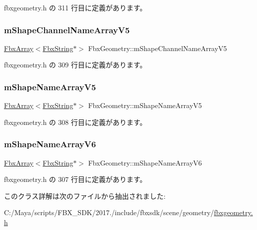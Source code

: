  fbxgeometry.\+h の 311 行目に定義があります。

\mbox{\label{class_fbx_geometry_a8752a5800b261d678592dc7a81dad4b0}} 
\subsubsection{\texorpdfstring{m\+Shape\+Channel\+Name\+Array\+V5}{mShapeChannelNameArrayV5}}
{\footnotesize\ttfamily \hyperlink{class_fbx_array}{Fbx\+Array}$<$\hyperlink{class_fbx_string}{Fbx\+String}$\ast$$>$ Fbx\+Geometry\+::m\+Shape\+Channel\+Name\+Array\+V5\hspace{0.3cm}{\ttfamily [protected]}}



 fbxgeometry.\+h の 309 行目に定義があります。

\mbox{\label{class_fbx_geometry_a2a38009f990f6dfa9ca81ee2b24b024b}} 
\subsubsection{\texorpdfstring{m\+Shape\+Name\+Array\+V5}{mShapeNameArrayV5}}
{\footnotesize\ttfamily \hyperlink{class_fbx_array}{Fbx\+Array}$<$\hyperlink{class_fbx_string}{Fbx\+String}$\ast$$>$ Fbx\+Geometry\+::m\+Shape\+Name\+Array\+V5\hspace{0.3cm}{\ttfamily [protected]}}



 fbxgeometry.\+h の 308 行目に定義があります。

\mbox{\label{class_fbx_geometry_a7f09646b7a716f58932d9be9c4a34486}} 
\subsubsection{\texorpdfstring{m\+Shape\+Name\+Array\+V6}{mShapeNameArrayV6}}
{\footnotesize\ttfamily \hyperlink{class_fbx_array}{Fbx\+Array}$<$\hyperlink{class_fbx_string}{Fbx\+String}$\ast$$>$ Fbx\+Geometry\+::m\+Shape\+Name\+Array\+V6\hspace{0.3cm}{\ttfamily [protected]}}



 fbxgeometry.\+h の 307 行目に定義があります。



このクラス詳解は次のファイルから抽出されました\+:\begin{DoxyCompactItemize}
\item 
C\+:/\+Maya/scripts/\+F\+B\+X\+\_\+\+S\+D\+K/2017./include/fbxsdk/scene/geometry/\hyperlink{fbxgeometry_8h}{fbxgeometry.\+h}\end{DoxyCompactItemize}
